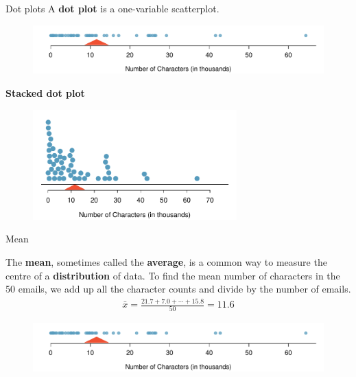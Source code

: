 \documentclass[12pt,a4paper]{beamer}
\begin{document}
\begin{frame}{Dot plots}
	A \textbf{dot plot} is a one-variable scatterplot.
	\begin{figure}[h]
	   \centering
	   \includegraphics[width=\textwidth]{figures/emailCharactersDotPlot/emailCharactersDotPlot}
	   \label{emailCharactersDotPlot}
	\end{figure}
	\textbf{Stacked dot plot}
	\begin{figure}[h]
	   \small\centering
	 \includegraphics[width=0.7\textwidth]{figures/emailCharactersDotPlot/emailCharactersDotPlotStacked}
	   \label{emailCharactersDotPlotStacked}
	\end{figure}	
\end{frame}
\begin{frame}{Mean}
	
The \textbf{mean}, sometimes called the \textbf{average}, is a common way to measure the centre of a \textbf{distribution} of data. To find the mean number of characters in the 50 emails, we add up all the character counts and divide by the number of emails. 
	\begin{eqnarray*}
	\bar{x} = \frac{21.7 + 7.0 + \cdots + 15.8}{50} = 11.6
	\end{eqnarray*}
	\begin{figure}[h]
	   \small\centering
	 \includegraphics[width=\textwidth]{figures/emailCharactersDotPlot/emailCharactersDotPlot}
	   \label{emailCharactersDotPlotStacked}
	\end{figure}
\end{frame}
\end{document}
